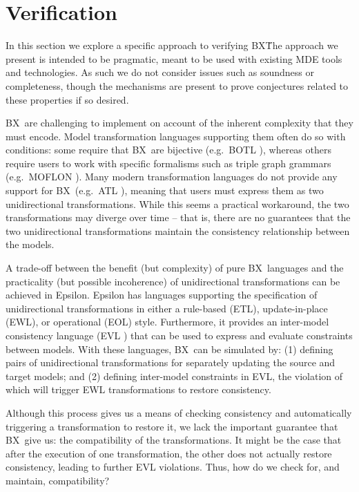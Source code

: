 \section{Verification}
\label{section:verification}

\newcommand{\BX}{BX}

In this section we explore a specific approach to verifying \BX\. The approach we present is intended to be pragmatic, meant to be used with existing MDE tools and technologies. As such we do not consider issues such as soundness or completeness, though the mechanisms are present to prove conjectures related to these properties if so desired.

\BX\ are challenging to implement on account of the inherent complexity that they must encode. Model transformation languages supporting them often do so with conditions: some require that \BX\ are bijective (e.g.\ BOTL \cite{Braun-Marschall03a}), whereas others require users to work with specific formalisms such as triple graph grammars (e.g.\ MOFLON \cite{AKRS06a}).  Many modern transformation languages do not provide any support for \BX\ (e.g.\ ATL \cite{JABK08a}), meaning that users must express them as two unidirectional transformations. While this seems a practical workaround, the two transformations may diverge over time -- that is, there are no guarantees that the two unidirectional transformations maintain the consistency relationship between the models.
	
A trade-off between the benefit (but complexity) of pure \BX\ languages and the practicality (but possible incoherence) of unidirectional transformations can be achieved in Epsilon. Epsilon has languages supporting the specification of unidirectional transformations in either a rule-based (ETL), update-in-place (EWL), or operational (EOL) \cite{Paige-KRDP09a} style. Furthermore, it provides an inter-model consistency language (EVL \cite{Kolovos-Paige-Polack09a}) that can be used to express and evaluate constraints between models. With these languages, \BX\ can be simulated by: (1) defining pairs of unidirectional transformations for separately updating the source and target models; and (2) defining inter-model constraints in EVL, the violation of which will trigger EWL transformations to restore consistency.
	
Although this process gives us a means of checking consistency and automatically triggering a transformation to restore it, we lack the important guarantee that \BX\ give us: the compatibility of the transformations. It might be the case that after the execution of one transformation, the other does not actually restore consistency, leading to further EVL violations. Thus, how do we check for, and maintain, compatibility? 
	
